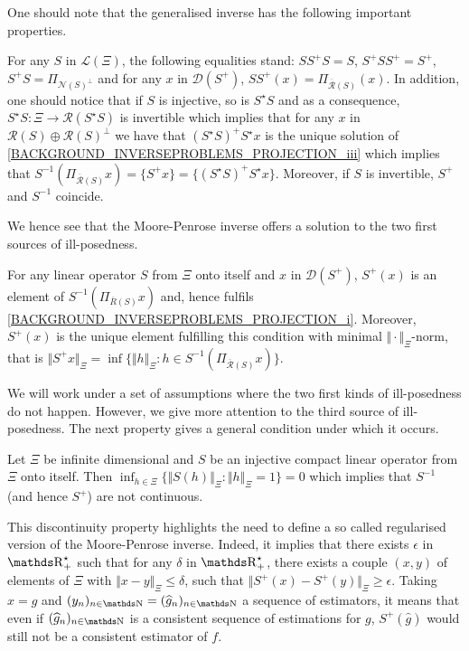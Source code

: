 One should note that the generalised inverse has the following important properties.

\begin{rmk}
For any $S$ in $\mathcal{L}(\Xi)$, the following equalities stand: $S S^{+} S = S$, $S^{+} S S^{+} = S^{+}$, $S^{+} S = \Pi_{\mathcal{N}(S)^{\perp}}$ and for any $x$ in $\mathcal{D}(S^{+})$, $S S^{+}(x) = \Pi_{\overline{\mathcal{R}}(S)}(x)$.
In addition, one should notice that if $S$ is injective, so is $S^{\star}S$ and as a consequence, $S^{\star}S : \Xi \rightarrow \mathcal{R}(S^{\star}S)$ is invertible which implies that for any $x$ in $\mathcal{R}(S) \oplus \mathcal{R}(S)^{\perp}$ we have that $(S^{\star} S)^{+} S^{\star} x$ is the unique solution of \ref{BACKGROUND_INVERSEPROBLEMS_PROJECTION_iii} which implies that $S^{-1}(\Pi_{\overline{\mathcal{R}}(S)}x) = \{S^{+} x\} = \{(S^{\star} S)^{+} S^{\star} x\}$.
Moreover, if $S$ is invertible, $S^{+}$ and $S^{-1}$ coincide.
\remEnd
\end{rmk}

We hence see that the Moore-Penrose inverse offers a solution to the two first sources of ill-posedness.

\begin{pr*}
For any linear operator $S$ from $\Xi$ onto itself and $x$ in $\mathcal{D}(S^{+})$, $S^{+}(x)$ is an element of $S^{-1}(\Pi_{\overline{R}(S)} x)$ and, hence fulfils \ref{BACKGROUND_INVERSEPROBLEMS_PROJECTION_i}.
Moreover, $S^{+}(x)$ is the unique element fulfilling this condition with minimal $\Vert \cdot \Vert_{\Xi}$-norm, that is $\Vert S^{+} x \Vert_{\Xi} = \inf \{\Vert h \Vert_{\Xi}: h \in S^{-1}(\Pi_{\overline{\mathcal{R}}(S)} x)\}$.
\reEnd
\end{pr*}

We will work under a set of assumptions where the two first kinds of ill-posedness do not happen.
However, we give more attention to the third source of ill-posedness.
The next property gives a general condition under which it occurs.

\begin{pr*}
Let $\Xi$ be infinite dimensional and $S$ be an injective compact linear operator from $\Xi$ onto itself.
Then $\inf_{h \in \Xi} \{\Vert S(h) \Vert_{\Xi}: \Vert h \Vert_{\Xi} = 1 \} = 0$ which implies that $S^{-1}$ (and hence $S^{+}$) are not continuous.
\reEnd
\end{pr*}

This discontinuity property highlights the need to define a so called regularised version of the Moore-Penrose inverse.
Indeed, it implies that there exists $\epsilon$ in $\R_{+}^{\star}$ such that for any $\delta$ in $\R_{+}^{\star}$, there exists a couple $(x, y)$ of elements of $\Xi$ with $\Vert x - y \Vert_{\Xi} \leq \delta$, such that $\Vert S^{+}(x) - S^{+}(y) \Vert_{\Xi} \geq \epsilon$.
Taking $x = g$ and $(y_{n})_{n \in \N} = (\widehat{g}_{n})_{n \in \N}$ a sequence of estimators, it means that even if $(\widehat{g}_{n})_{n \in \N}$ is a consistent sequence of estimations for $g$, $S^{+}(\widehat{g})$ would still not be a consistent estimator of $f$.

